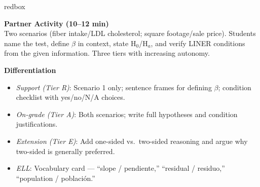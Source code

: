 \documentclass[10pt]{article}
\begin{document}
\begin{skillbox}{redbox}
\begin{minipage}[t]{0.48\linewidth}
    \textbf{Partner Activity (10--12 min)}\\
    Two scenarios (fiber intake/LDL cholesterol; square footage/sale price). Students
    name the test, define $\beta$ in context, state H$_0$/H$_a$, and verify LINER
    conditions from the given information. Three tiers with increasing autonomy.
\end{minipage}
\hfill
\begin{minipage}[t]{0.48\linewidth}
    \textbf{Differentiation}
    \begin{itemize}
        \item \textit{Support (Tier R)}: Scenario 1 only; sentence frames for
              defining $\beta$; condition checklist with yes/no/N/A choices.
        \item \textit{On-grade (Tier A)}: Both scenarios; write full hypotheses and
              condition justifications.
        \item \textit{Extension (Tier E)}: Add one-sided vs.\ two-sided reasoning
              and argue why two-sided is generally preferred.
        \item \textit{ELL}: Vocabulary card --- ``slope / pendiente,''
              ``residual / residuo,'' ``population / poblaci\'{o}n.''
    \end{itemize}
\end{minipage}
\end{skillbox}
\end{document}
